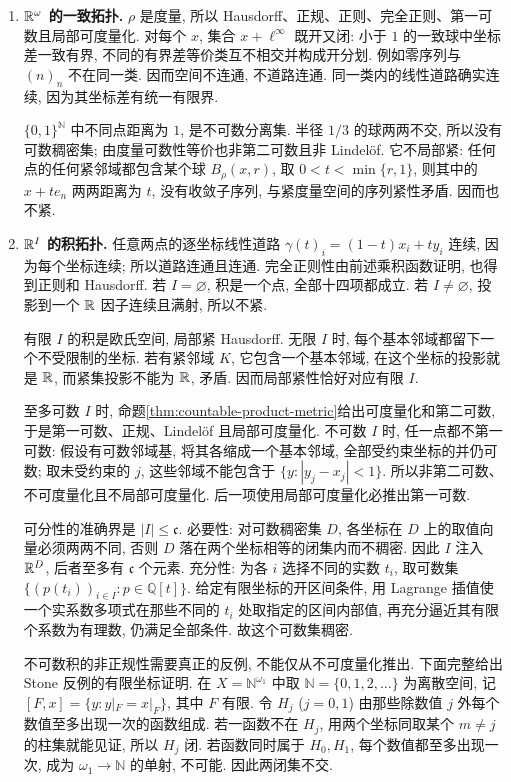\begin{solution}
\begin{enumerate}
\item \textbf{$\mathbb R^\omega$ 的一致拓扑.}
$\rho$ 是度量, 所以 Hausdorff、正规、正则、完全正则、第一可数且局部可度量化. 对每个 $x$, 集合 $x+\ell^\infty$ 既开又闭: 小于 $1$ 的一致球中坐标差一致有界, 不同的有界差等价类互不相交并构成开分划. 例如零序列与 $(n)_n$ 不在同一类. 因而空间不连通, 不道路连通. 同一类内的线性道路确实连续, 因为其坐标差有统一有限界.

$\{0,1\}^{\mathbb N}$ 中不同点距离为 $1$, 是不可数分离集. 半径 $1/3$ 的球两两不交, 所以没有可数稠密集; 由度量可数性等价也非第二可数且非 Lindel\"of. 它不局部紧: 任何点的任何紧邻域都包含某个球 $B_\rho(x,r)$, 取 $0<t<\min\{r,1\}$, 则其中的 $x+t e_n$ 两两距离为 $t$, 没有收敛子序列, 与紧度量空间的序列紧性矛盾. 因而也不紧.

\item \textbf{$\mathbb R^I$ 的积拓扑.}
任意两点的逐坐标线性道路 $\gamma(t)_i=(1-t)x_i+ty_i$ 连续, 因为每个坐标连续; 所以道路连通且连通. 完全正则性由前述乘积函数证明, 也得到正则和 Hausdorff. 若 $I=\varnothing$, 积是一个点, 全部十四项都成立. 若 $I\ne\varnothing$, 投影到一个 $\mathbb R$ 因子连续且满射, 所以不紧.

有限 $I$ 的积是欧氏空间, 局部紧 Hausdorff. 无限 $I$ 时, 每个基本邻域都留下一个不受限制的坐标. 若有紧邻域 $K$, 它包含一个基本邻域, 在这个坐标的投影就是 $\mathbb R$, 而紧集投影不能为 $\mathbb R$, 矛盾. 因而局部紧性恰好对应有限 $I$.

至多可数 $I$ 时, 命题\ref{thm:countable-product-metric}给出可度量化和第二可数, 于是第一可数、正规、Lindel\"of 且局部可度量化. 不可数 $I$ 时, 任一点都不第一可数: 假设有可数邻域基, 将其各缩成一个基本邻域, 全部受约束坐标的并仍可数; 取未受约束的 $j$, 这些邻域不能包含于 $\{y:|y_j-x_j|<1\}$. 所以非第二可数、不可度量化且不局部可度量化. 后一项使用局部可度量化必推出第一可数.

可分性的准确界是 $|I|\le\mathfrak c$. 必要性: 对可数稠密集 $D$, 各坐标在 $D$ 上的取值向量必须两两不同, 否则 $D$ 落在两个坐标相等的闭集内而不稠密. 因此 $I$ 注入 $\mathbb R^D$, 后者至多有 $\mathfrak c$ 个元素. 充分性: 为各 $i$ 选择不同的实数 $t_i$, 取可数集 $\{(p(t_i))_{i\in I}:p\in\mathbb Q[t]\}$. 给定有限坐标的开区间条件, 用 Lagrange 插值使一个实系数多项式在那些不同的 $t_i$ 处取指定的区间内部值, 再充分逼近其有限个系数为有理数, 仍满足全部条件. 故这个可数集稠密.

不可数积的非正规性需要真正的反例, 不能仅从不可度量化推出. 下面完整给出 Stone 反例的有限坐标证明. 在 $X=\mathbb N^{\omega_1}$ 中取 $\mathbb N=\{0,1,2,\ldots\}$ 为离散空间, 记 $[F,x]=\{y:y|_F=x|_F\}$, 其中 $F$ 有限. 令 $H_j$ ($j=0,1$) 由那些除数值 $j$ 外每个数值至多出现一次的函数组成. 若一函数不在 $H_j$, 用两个坐标同取某个 $m\ne j$ 的柱集就能见证, 所以 $H_j$ 闭. 若函数同时属于 $H_0,H_1$, 每个数值都至多出现一次, 成为 $\omega_1\to\mathbb N$ 的单射, 不可能. 因此两闭集不交.


\end{enumerate}
\end{solution}
